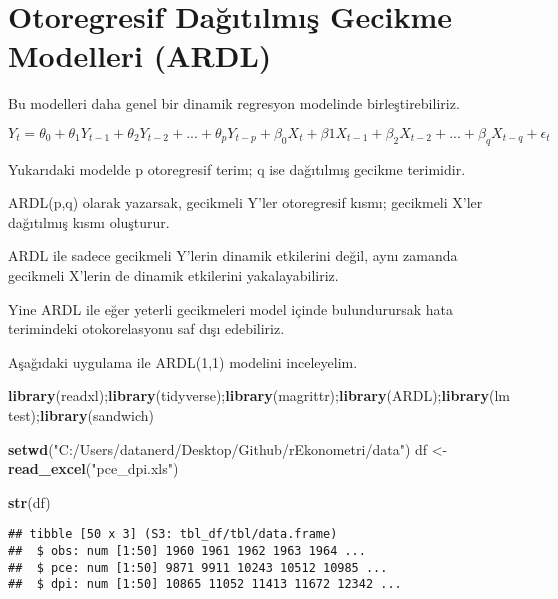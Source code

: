 \documentclass[
]{book}
\newenvironment{Shaded}{\begin{snugshade}}{\end{snugshade}}
\newcommand{\KeywordTok}[1]{\textcolor[rgb]{0.13,0.29,0.53}{\textbf{#1}}}
\newcommand{\NormalTok}[1]{#1}
\newcommand{\StringTok}[1]{\textcolor[rgb]{0.31,0.60,0.02}{#1}}
\begin{document}
\hypertarget{otoregresif-daux11fux131tux131lmux131ux15f-gecikme-modelleri-ardl}{%
\section{Otoregresif Dağıtılmış Gecikme Modelleri (ARDL)}\label{otoregresif-daux11fux131tux131lmux131ux15f-gecikme-modelleri-ardl}}

Bu modelleri daha genel bir dinamik regresyon modelinde birleştirebiliriz.

\(Y_t = \theta_0 + \theta_1Y_{t-1} + \theta_2Y_{t-2} + ... + \theta_pY_{t-p} + \beta_0X_t + \beta1X_{t-1} + \beta_2X_{t-2} + ... + \beta_qX_{t-q} + \epsilon_t\)

Yukarıdaki modelde p otoregresif terim; q ise dağıtılmış gecikme terimidir.

ARDL(p,q) olarak yazarsak, gecikmeli Y'ler otoregresif kısmı; gecikmeli X'ler dağıtılmış kısmı oluşturur.

ARDL ile sadece gecikmeli Y'lerin dinamik etkilerini değil, aynı zamanda gecikmeli X'lerin de dinamik etkilerini yakalayabiliriz.

Yine ARDL ile eğer yeterli gecikmeleri model içinde bulundurursak hata terimindeki otokorelasyonu saf dışı edebiliriz.

Aşağıdaki uygulama ile ARDL(1,1) modelini inceleyelim.

\begin{Shaded}
\begin{Highlighting}[]
\KeywordTok{library}\NormalTok{(readxl);}\KeywordTok{library}\NormalTok{(tidyverse);}\KeywordTok{library}\NormalTok{(magrittr);}\KeywordTok{library}\NormalTok{(ARDL);}\KeywordTok{library}\NormalTok{(lmtest);}\KeywordTok{library}\NormalTok{(sandwich)}

\KeywordTok{setwd}\NormalTok{(}\StringTok{"C:/Users/datanerd/Desktop/Github/rEkonometri/data"}\NormalTok{)}
\NormalTok{df <-}\StringTok{ }\KeywordTok{read_excel}\NormalTok{(}\StringTok{"pce_dpi.xls"}\NormalTok{)}

\KeywordTok{str}\NormalTok{(df)}
\end{Highlighting}
\end{Shaded}

\begin{verbatim}
## tibble [50 x 3] (S3: tbl_df/tbl/data.frame)
##  $ obs: num [1:50] 1960 1961 1962 1963 1964 ...
##  $ pce: num [1:50] 9871 9911 10243 10512 10985 ...
##  $ dpi: num [1:50] 10865 11052 11413 11672 12342 ...
\end{verbatim}
\end{document}
